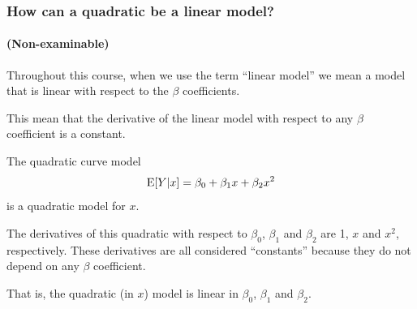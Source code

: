 \documentclass{beamer}\usepackage[]{graphicx}\usepackage[]{xcolor}
\begin{document}
\begin{frame}[ fragile]
\frametitle{How can a quadratic be a linear model?}
\framesubtitle{(Non-examinable)}
Throughout this course, when we use the term ``linear model'' we mean a model that is linear with respect to the $\beta$ coefficients. 
\medskip

This mean that the derivative of the linear model with respect to any $\beta$ coefficient is a constant.
\medskip

The quadratic curve model
\[ 
\operatorname{E}[Y|x] = \beta_0 + \beta_1 x + \beta_2 x^2 
\]
is a quadratic model for $x$.
\medskip

The derivatives of this quadratic with respect to $\beta_0$, $\beta_1$ and $\beta_2$ are 1, $x$ and $x^2$, respectively. These derivatives are all considered ``constants'' because they do not depend on any $\beta$ coefficient. 
\medskip

That is, the quadratic (in $x$) model is linear in $\beta_0$, $\beta_1$ and $\beta_2$.
\end{frame}
\end{document}
